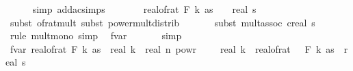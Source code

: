 \begin{isabellebody}
\ \ \ \ \isamarkupfalse%
\ {\isacharparenleft}{\kern0pt}simp\ add{\isacharcolon}{\kern0pt}ac{\isacharunderscore}{\kern0pt}simps{\isacharparenright}{\kern0pt}\isanewline
\ \ \isamarkupfalse%
\ \isamarkupfalse%
\ {\isachardoublequoteopen}{\isachardot}{\kern0pt}{\isachardot}{\kern0pt}{\isachardot}{\kern0pt}\ {\isasymle}\ {\isacharparenleft}{\kern0pt}real{\isacharunderscore}{\kern0pt}of{\isacharunderscore}{\kern0pt}rat\ {\isacharparenleft}{\kern0pt}F\ k\ as\ {\isacharasterisk}{\kern0pt}\ {\isasymdelta}{\isacharparenright}{\kern0pt}{\isacharparenright}{\kern0pt}\ {\isacharasterisk}{\kern0pt}\ {\isacharparenleft}{\kern0pt}real\ s\ {\isacharslash}{\kern0pt}\ {}{\isacharparenright}{\kern0pt}{\isachardoublequoteclose}\isanewline
\ \ \ \ \isamarkupfalse%
\ {\isacharparenleft}{\kern0pt}subst\ of{\isacharunderscore}{\kern0pt}rat{\isacharunderscore}{\kern0pt}mult{\isacharcomma}{\kern0pt}\ subst\ power{\isacharunderscore}{\kern0pt}mult{\isacharunderscore}{\kern0pt}distrib{\isacharparenright}{\kern0pt}\ \isanewline
\ \ \ \ \isamarkupfalse%
\ {\isacharparenleft}{\kern0pt}subst\ mult{\isachardot}{\kern0pt}assoc{\isacharbrackleft}{\kern0pt}\ c{\isacharequal}{\kern0pt}{\isachardoublequoteopen}real\ s\ {\isacharslash}{\kern0pt}\ {}{\isachardoublequoteclose}{\isacharbrackright}{\kern0pt}{\isacharparenright}{\kern0pt}\isanewline
\ \ \ \ \isamarkupfalse%
\ {\isacharparenleft}{\kern0pt}rule\ mult{\isacharunderscore}{\kern0pt}mono{\isacharcomma}{\kern0pt}\ simp{\isacharparenright}{\kern0pt}\ \isamarkupfalse%
\ f{}{\isacharunderscore}{\kern0pt}var{\isacharunderscore}{\kern0pt}{}\ \isanewline
\ \ \ \ \isamarkupfalse%
\ {\isacharparenleft}{\kern0pt}simp{\isacharplus}{\kern0pt}{\isacharparenright}{\kern0pt}\isanewline
\ \ \isamarkupfalse%
\ \isamarkupfalse%
\ f{}{\isacharunderscore}{\kern0pt}var{\isacharunderscore}{\kern0pt}{}{\isacharcolon}{\kern0pt}\ {\isachardoublequoteopen}{\isacharparenleft}{\kern0pt}real{\isacharunderscore}{\kern0pt}of{\isacharunderscore}{\kern0pt}rat\ {\isacharparenleft}{\kern0pt}F\ k\ as{\isacharparenright}{\kern0pt}{\isacharparenright}{\kern0pt}\ {\isacharasterisk}{\kern0pt}\ real\ k\ {\isacharasterisk}{\kern0pt}\ real\ n\ powr\ {\isacharparenleft}{\kern0pt}{}\ {\isacharminus}{\kern0pt}\ {}\ {\isacharslash}{\kern0pt}\ real\ k{\isacharparenright}{\kern0pt}\ {\isasymle}\ {\isacharparenleft}{\kern0pt}real{\isacharunderscore}{\kern0pt}of{\isacharunderscore}{\kern0pt}rat\ {\isacharparenleft}{\kern0pt}{\isasymdelta}\ {\isacharasterisk}{\kern0pt}\ F\ k\ as{\isacharparenright}{\kern0pt}{\isacharparenright}{\kern0pt}\ {\isacharasterisk}{\kern0pt}\ real\ s\ {\isacharslash}{\kern0pt}\ {}{\isachardoublequoteclose}\isanewline

\end{isabellebody}
